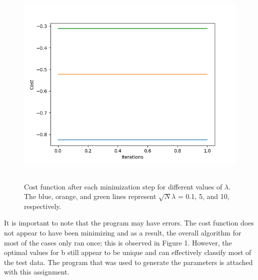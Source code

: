\begin{figure}
    \centering
    \includegraphics[height=4in]{Figure.png}
    \caption{Cost function after each minimization step for different values of $\lambda$. The blue, orange, and green lines represent $\sqrt{N}\lambda$ = 0.1, 5, and 10, respectively.}
\end{figure}

It is important to note that the program may have errors. The cost function does not appear to have been minimizing and as a result, the overall algorithm for most of the cases only ran once; this is observed in Figure 1. However, the optimal values for b still appear to be unique and can effectively classify most of the test data. The program that was used to generate the parameters is attached with this assignment.